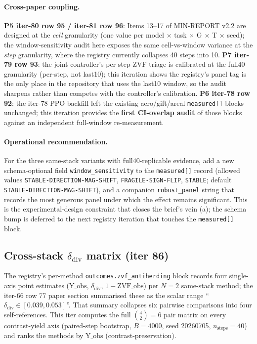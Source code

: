 \documentclass{article}
\begin{document}
\paragraph{Cross-paper coupling.}
\textbf{P5 iter-80 row 95 / iter-81 row 96}: Items 13--17 of MIN-REPORT
v2.2 are designed at the \emph{cell} granularity (one value per
model $\times$ task $\times$ G $\times$ T $\times$ seed); the
window-sensitivity audit here exposes the same cell-vs-window
variance at the \emph{step} granularity, where the registry
currently collapses 40 steps into 10. \textbf{P7 iter-79 row 93}:
the joint controller's per-step ZVF-triage is calibrated at the
full40 granularity (per-step, not last10); this iteration shows the
registry's panel tag is the only place in the repository that uses
the last10 window, so the audit sharpens rather than competes with
the controller's calibration. \textbf{P6 iter-78 row 92}: the
iter-78 PPO backfill left the existing aero/gift/areal
\texttt{measured[]} blocks unchanged; this iteration provides the
\textbf{first CI-overlap audit} of those blocks against an
independent full-window re-measurement.

\paragraph{Operational recommendation.}
For the three same-stack variants with full40-replicable evidence,
add a new schema-optional field \texttt{window\_sensitivity} to the
\texttt{measured[]} record (allowed values
\texttt{STABLE-DIRECTION-MAG-SHIFT}, \texttt{FRAGILE-SIGN-FLIP},
\texttt{STABLE}; default \texttt{STABLE-DIRECTION-MAG-SHIFT}), and
a companion \texttt{robust\_panel} string that records the most
generous panel under which the effect remains significant. This is
the experimental-design constraint that closes the brief's vein
(a); the schema bump is deferred to the next registry iteration
that touches the \texttt{measured[]} block. \subsection{Cross-stack \texorpdfstring{$\delta_{\mathrm{div}}$}{delta-div} matrix (iter 86)}
\label{sec:p6-iter86-cross-stack-matrix}

The registry's per-method \verb|outcomes.zvf_antiherding| block
records four single-axis point estimates
($\mathrm{Y\_obs}$, $\delta_{\mathrm{div}}$, $1-\mathrm{ZVF\_obs}$) per
$N\!=\!2$ same-stack method; the iter-66 row 77 paper section summarised
these as the scalar range ``$\delta_{\mathrm{div}} \in [0.039, 0.053]$''.
That summary collapses six pairwise comparisons into four self-references.
This iter computes the full $\binom{4}{2}=6$ pair matrix on every
contrast-yield axis (paired-step bootstrap, $B\!=\!4000$, seed
20260705, $n_{\mathrm{steps}}\!=\!40$) and ranks the methods by
$\mathrm{Y\_obs}$ (contrast-preservation).
\end{document}

